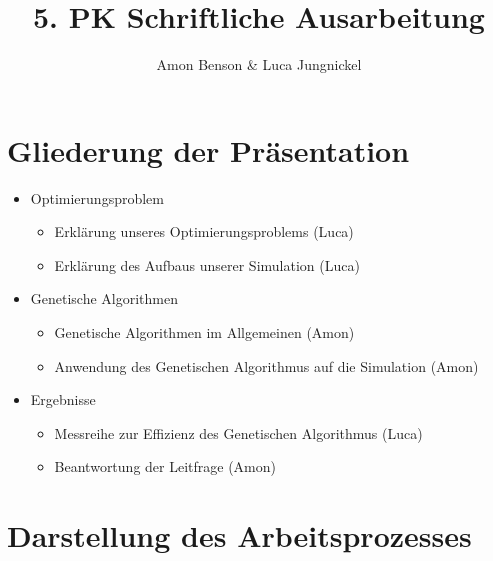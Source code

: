 \documentclass[a4paper, 11pt]{scrartcl}
\title{5. PK Schriftliche Ausarbeitung}
\author{Amon Benson \& Luca Jungnickel}
\date{}
\begin{document}
\maketitle
\newpage

\tableofcontents
\newpage

\setcounter{page}{1}



\newpage
\section{Gliederung der Präsentation}

\begin{itemize}

\item{Optimierungsproblem}
\begin{itemize}
\item Erklärung unseres Optimierungsproblems (Luca)
\item Erklärung des Aufbaus unserer Simulation (Luca)
\end{itemize}

\item{Genetische Algorithmen}
\begin{itemize}
\item Genetische Algorithmen im Allgemeinen (Amon)
\item Anwendung des Genetischen Algorithmus auf die Simulation (Amon)
\end{itemize}

\item{Ergebnisse}
\begin{itemize}
\item Messreihe zur Effizienz des Genetischen Algorithmus (Luca)
\item Beantwortung der Leitfrage (Amon)
\end{itemize}
\end{itemize}



\newpage
\section{Darstellung des Arbeitsprozesses}



\end{document}
